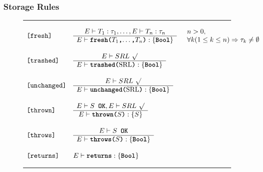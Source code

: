 \documentclass[12pt]{article} %
\newcommand{\reserved}[1]{\textbf{\texttt{#1}}} %
\newcommand{\RULELAB}[1]{\texttt{#1}}
\newcommand{\UNSPACEFORBOX}{\vspace{-2ex}}
\newcommand{\HLINE}{\UNSPACEFORBOX%
\begin{flushleft}\rule{\textwidth}{0.01in}\end{flushleft}%
\UNSPACEFORBOX}
\newenvironment{BFIGURE}{

\begin{figure}
\small
\HLINE
}{
\HLINE
\normalsize
\end{figure}
}
\begin{document}
\subsubsection{Storage Rules}
\label{storerules}

\begin{BFIGURE}
\begin{displaymath}
\begin{array}{lll}
\RULELAB{[fresh]} &
\begin{array}{c}
E \vdash T_1:\tau_1,\dots, E \vdash T_n:\tau_n\\
\hline
E \vdash
\mbox{\reserved{fresh(}$T_1$\reserved{,}\dots\reserved{,}$T_n$\reserved{)}}:\{\reserved{Bool}\}
\end{array}
&
\begin{array}{l}
n > 0,\\
\forall k (1 \leq k \leq n) \Rightarrow \tau_k \not= \emptyset
\end{array}
\\
~\\
\RULELAB{[trashed]} &
\begin{array}{c}
E \vdash SRL~\surd\\
\hline
E \vdash \mbox{\reserved{trashed(}SRL\reserved{)}}:\{\reserved{Bool}\}
\end{array}
\\
~\\
\RULELAB{[unchanged]} &
\begin{array}{c}
E \vdash SRL~\surd\\
\hline
E \vdash \mbox{\reserved{unchanged(}SRL\reserved{)}}:\{\reserved{Bool}\}
\end{array}
\\
~\\
\RULELAB{[thrown]} &
\begin{array}{c}
E \vdash S \reserved{ OK}, E \vdash SRL~\surd \\
\hline
E \vdash \mbox{\reserved{thrown(}}S\reserved{)}:\{S\}
\end{array}
\\
~\\
\RULELAB{[throws]} &
\begin{array}{c}
E \vdash S \reserved{ OK}\\
\hline
E \vdash \mbox{\reserved{throws(}}S\reserved{)}:\{\reserved{Bool}\}
\end{array}
\\
~\\
\RULELAB{[returns]} &
E \vdash \reserved{returns}:\{\reserved{Bool}\}
\\

\end{array}
\end{displaymath}
\end{BFIGURE}
\end{document}
